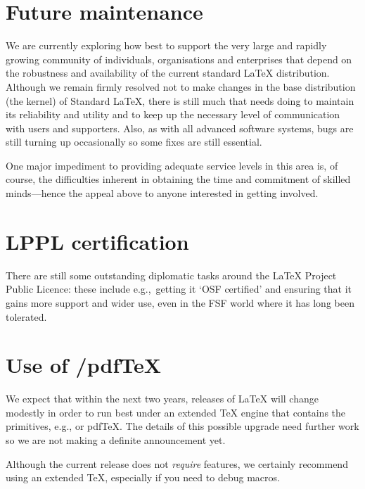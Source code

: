 \documentclass{ltnews}
\begin{document}
\section{Future maintenance}

We are currently exploring how best to support the very large and
rapidly growing community of individuals, organisations and
enterprises that depend on the robustness and availability of the
current standard \LaTeX{} distribution.  Although we remain firmly\newline
resolved not to make changes in the base distribution (the kernel) of
Standard \LaTeX{}, there is still much that needs doing to maintain
its reliability and utility and to keep up the necessary level of
communication with users and supporters.  Also, as with all advanced
software systems, bugs are still turning up occasionally so %
some fixes are still essential.

One major impediment to providing adequate service levels in this area
is, of course, the difficulties inherent in obtaining the time and
commitment of skilled minds---hence the appeal above to anyone
interested %
in getting involved.


\section{LPPL certification}

There are still some outstanding diplomatic tasks around the
\LaTeX{} Project Public Licence: these include
e.g.,~getting it `OSF certified' and ensuring that it gains
more support and wider use, even in the FSF world\newline
where it has long been tolerated.


\section{Use of \eTeX/pdf\TeX}

We expect that within the next two years, releases of \LaTeX{} will
change modestly in order to run best under an extended \TeX{} engine
that contains the \eTeX{} primitives, e.g., \eTeX{} or pdf\TeX{}.
The details of this possible upgrade need further work so we are not
making a definite announcement yet.

Although the current release does not \emph{require} \eTeX{} features,
we certainly recommend using an extended \TeX{}, especially if you
need to debug macros.
\end{document}
